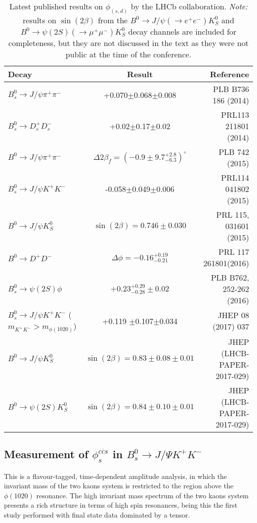 \documentclass[12pt]{article}
\begin{document}
\begin{table}[b]
\begin{footnotesize}
\begin{center}
\begin{tabular}{l| c r}	

	Decay & Result & Reference\\
	\hline
	$B^0_s\rightarrow J/\psi \pi^+\pi^-$ & +0.070$\pm$0.068$\pm$0.008&PLB B736 186 (2014)\\
	$B^0_s \rightarrow D^+_sD^-_s$ &+0.02$\pm$0.17$\pm$0.02 &PRL113 211801 (2014)\\
	$B^0\rightarrow J/\psi \pi^+\pi^-$ & $\Delta2\beta_f = (-0.9\pm9.7^{+2.8}_{-6.3})^\circ$ & PLB 742 (2015)\\
	$B^0_s\rightarrow J/\psi K^+K^-$ &-0.058$\pm$0.049$\pm$0.006 &PRL114 041802 (2015)\\
	$B^0 \rightarrow J/\psi K_S^0$ & $\sin(2\beta) = 0.746\pm 0.030 $ & PRL 115, 031601 (2015)\\
	$B^0 \rightarrow D^+D^-$ & $\Delta\phi=-0.16^{+0.19}_{-0.21}$ & PRL 117 261801(2016)\\
	$B^0_s \rightarrow \psi(2S)\phi$ &$+0.23^{+0.29}_{-0.28}\pm0.02$ &PLB B762, 252-262 (2016)\\
	$B^0_s\rightarrow J/\psi K^+K^-$ ($m_{K^+K^-}>m_{\phi(1020)}$) &+0.119 $\pm$0.107$\pm$0.034 & JHEP 08 (2017) 037\\
	$B^0\rightarrow J/\psi K^0_S$ & $\sin(2\beta) = 0.83 \pm 0.08 \pm 0.01 $ & JHEP (LHCB-PAPER-2017-029) \\
	$B^0\rightarrow \psi(2S) K^0_S$ & $\sin(2\beta) = 0.84 \pm 0.10 \pm 0.01 $ & JHEP (LHCB-PAPER-2017-029) \\
		\hline

\end{tabular}
\caption{Latest published results on $\phi_{(s,d)}$ by the LHCb collaboration. \textit{Note:} results on $\sin(2\beta)$ from the $B^0\rightarrow J/\psi (\rightarrow e^+e^-) K^0_S$ and $B^0\rightarrow \psi(2S)(\rightarrow \mu^+\mu^-) K^0_S$ decay channels are included for completeness, but they are not discussed in the text as they were not public at the time of the conference.}
\label{tab:a1}
\end{center}
\end{footnotesize}
\end{table}

\subsection{Measurement of $\phi^{c\overline{c}s}_s$ in $B^0_s\rightarrow J/\Psi K^+K^-$}
This is a flavour-tagged, time-dependent amplitude analysis, in which the invariant mass of the two kaons system is restricted to the region above the $\phi(1020)$ resonance. The high invariant mass spectrum of the two kaons system presents a rich structure in terms of high spin resonances, being this the first study performed with final state data dominated by a tensor. 
\end{document}
